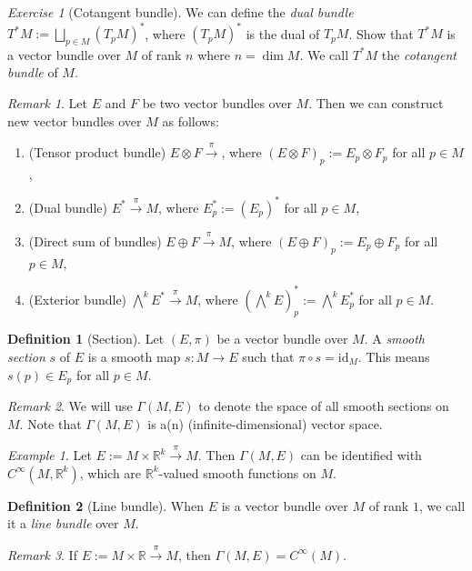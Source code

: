 \documentclass[11pt]{amsart}
\numberwithin{equation}{section}
\theoremstyle{plain}
\theoremstyle{definition}
\newtheorem{defn}{Definition}[subsection]
\theoremstyle{remark}
\newtheorem{rem}{Remark}[subsection]
\newtheorem{exe}{Exercise}[subsection]
\newtheorem{ex}{Example}[subsection]
\newcommand{\R}{\mathbb{R}}
\newcommand{\id}{\mathrm{id}}
\begin{document}
\begin{exe}[Cotangent bundle]
We can define the \emph{dual bundle} $T^*M:=\bigsqcup_{p\in M}(T_pM)^*$, where $(T_pM)^*$ is the dual of $T_pM$. Show that $T^*M$ is a vector bundle over $M$ of rank $n$ where $n=\dim M$. We call $T^*M$ the \emph{cotangent bundle} of $M$.
\end{exe}

\begin{rem}
Let $E$ and $F$ be two vector bundles over $M$. Then we can construct new vector bundles over $M$ as follows:
\begin{enumerate}
\item{(Tensor product bundle)
$E\otimes F\xrightarrow{\pi}$, where $(E\otimes F)_p:=E_p\otimes F_p$ for all $p\in M$,
}
\item{(Dual bundle)
$E^*\xrightarrow{\pi}M$, where $E_p^*:=(E_p)^*$ for all $p\in M$,
}
\item{(Direct sum of bundles)
$E\oplus F\xrightarrow{\pi}M$, where $(E\oplus F)_p:=E_p\oplus F_p$ for all $p\in M$,
}
\item{(Exterior bundle)
$\bigwedge^kE^*\xrightarrow{\pi} M$, where $(\bigwedge^kE)^*_p:=\bigwedge^k E_p^*$ for all $p\in M$.
}
\end{enumerate}
\end{rem}

\begin{defn}[Section]
Let $(E,\pi)$ be a vector bundle over $M$. A \emph{smooth section} $s$ of $E$ is a smooth map $s\colon M\to E$ such that $\pi\circ s=\id_M$. This means $s(p)\in E_p$ for all $p\in M$.
\end{defn}
\begin{rem}
We will use $\Gamma(M,E)$ to denote the space of all smooth sections on $M$. Note that $\Gamma(M,E)$ is a(n) (infinite-dimensional) vector space. 
\end{rem}

\begin{ex}
Let $E:=M\times \R^k\xrightarrow{\pi}M$. Then $\Gamma(M,E)$ can be identified with $C^\infty(M,\R^k)$, which are $\R^k$-valued smooth functions on $M$.
\end{ex}

\begin{defn}[Line bundle]
When $E$ is a vector bundle over $M$ of rank $1$, we call it a \emph{line bundle} over $M$.
\end{defn}

\begin{rem}
If $E:=M\times\R\xrightarrow{\pi}M$, then $\Gamma(M,E)=C^\infty(M)$.
\end{rem}
\end{document}
